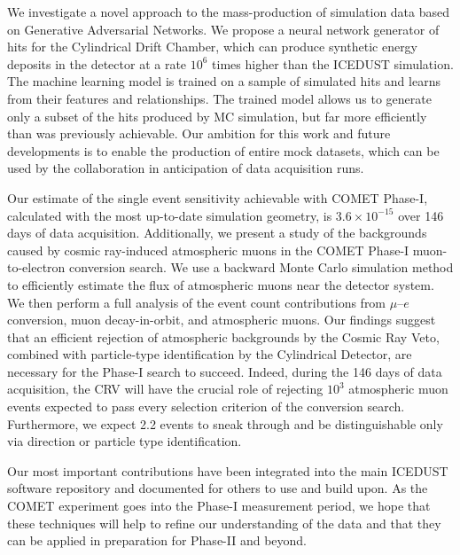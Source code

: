 We investigate a novel approach to the mass-production of simulation data based
on Generative Adversarial Networks. We propose a neural network generator of
hits for the Cylindrical Drift Chamber, which can produce synthetic energy
deposits in the detector at a rate $10^6$ times higher than the ICEDUST
simulation. The machine learning model is trained on a sample of simulated hits
and learns from their features and relationships. The trained model allows us to
generate only a subset of the hits produced by MC simulation, but far more
efficiently than was previously achievable. Our ambition for this work and
future developments is to enable the production of entire mock datasets, which
can be used by the collaboration in anticipation of data acquisition runs.

Our estimate of the single event sensitivity achievable with COMET
Phase\nobreakdash-I, calculated with the most up-to-date simulation geometry, is
$3.6 \times 10^{-15}$ over 146 days of data acquisition. Additionally, we
present a study of the backgrounds caused by cosmic ray-induced atmospheric
muons in the COMET Phase\nobreakdash-I muon-to-electron conversion search. We
use a backward Monte Carlo simulation method to efficiently estimate the flux of
atmospheric muons near the detector system. We then perform a full analysis of
the event count contributions from $\mu$--$e$ conversion, muon decay-in-orbit,
and atmospheric muons. Our findings suggest that an efficient rejection of
atmospheric backgrounds by the Cosmic Ray Veto, combined with particle-type
identification by the Cylindrical Detector, are necessary for the
Phase\nobreakdash-I search to succeed. 
Indeed, during the 146 days of data acquisition, the CRV will have the crucial
role of rejecting $10^3$ atmospheric muon events expected to pass every
selection criterion of the conversion search. Furthermore, we expect 2.2 events
to sneak through and be distinguishable only via direction or particle type
identification.


Our most important contributions have been integrated into the main ICEDUST
software repository and documented for others to use and build upon. As the
COMET experiment goes into the Phase\nobreakdash-I measurement period, we hope
that these techniques will help to refine our understanding of the data and that
they can be applied in preparation for Phase\nobreakdash-II and beyond.
